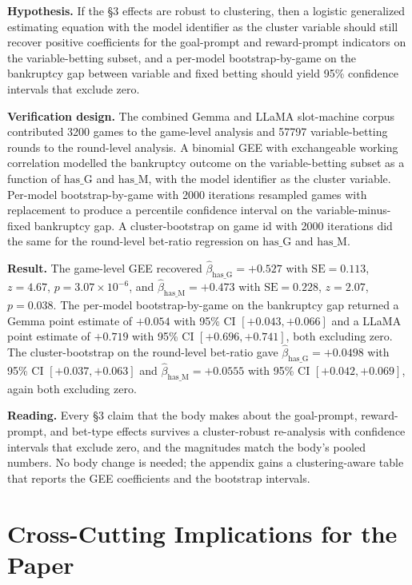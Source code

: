 \documentclass[11pt,a4paper]{article}
\begin{document}
\textbf{Hypothesis.} If the \S3 effects are robust to clustering, then a logistic generalized estimating equation with the model identifier as the cluster variable should still recover positive coefficients for the goal-prompt and reward-prompt indicators on the variable-betting subset, and a per-model bootstrap-by-game on the bankruptcy gap between variable and fixed betting should yield 95\% confidence intervals that exclude zero.

\textbf{Verification design.} The combined Gemma and LLaMA slot-machine corpus contributed 3200 games to the game-level analysis and 57797 variable-betting rounds to the round-level analysis. A binomial GEE with exchangeable working correlation modelled the bankruptcy outcome on the variable-betting subset as a function of $\text{has\_G}$ and $\text{has\_M}$, with the model identifier as the cluster variable. Per-model bootstrap-by-game with 2000 iterations resampled games with replacement to produce a percentile confidence interval on the variable-minus-fixed bankruptcy gap. A cluster-bootstrap on game id with 2000 iterations did the same for the round-level bet-ratio regression on $\text{has\_G}$ and $\text{has\_M}$.

\textbf{Result.} The game-level GEE recovered $\hat{\beta}_\text{has\_G} = +0.527$ with $\text{SE} = 0.113$, $z = 4.67$, $p = 3.07 \times 10^{-6}$, and $\hat{\beta}_\text{has\_M} = +0.473$ with $\text{SE} = 0.228$, $z = 2.07$, $p = 0.038$. The per-model bootstrap-by-game on the bankruptcy gap returned a Gemma point estimate of $+0.054$ with 95\% CI $[+0.043, +0.066]$ and a LLaMA point estimate of $+0.719$ with 95\% CI $[+0.696, +0.741]$, both excluding zero. The cluster-bootstrap on the round-level bet-ratio gave $\hat{\beta}_\text{has\_G} = +0.0498$ with 95\% CI $[+0.037, +0.063]$ and $\hat{\beta}_\text{has\_M} = +0.0555$ with 95\% CI $[+0.042, +0.069]$, again both excluding zero.

\textbf{Reading.} Every \S3 claim that the body makes about the goal-prompt, reward-prompt, and bet-type effects survives a cluster-robust re-analysis with confidence intervals that exclude zero, and the magnitudes match the body's pooled numbers. No body change is needed; the appendix gains a clustering-aware table that reports the GEE coefficients and the bootstrap intervals.

\section*{Cross-Cutting Implications for the Paper}
\end{document}
